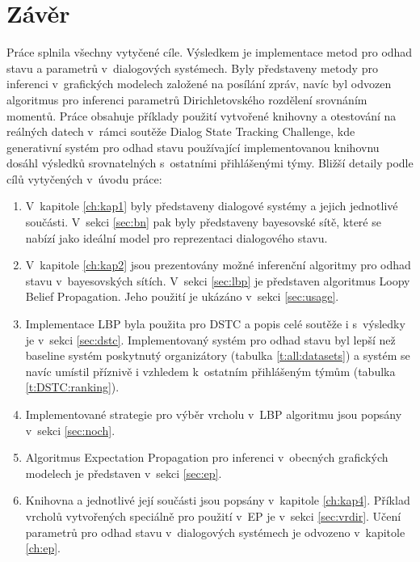 \chapter*{Závěr}

Práce splnila všechny vytyčené cíle.
Výsledkem je implementace metod pro odhad stavu a parametrů v~dialogových systémech.
Byly představeny metody pro inferenci v~grafických modelech založené na posílání zpráv, navíc byl odvozen algoritmus pro inferenci parametrů Dirichletovského rozdělení srovnáním momentů.
Práce obsahuje příklady použití vytvořené knihovny a otestování na reálných datech v~rámci soutěže Dialog State Tracking Challenge, kde generativní systém pro odhad stavu používající implementovanou knihovnu dosáhl výsledků srovnatelných s~ostatními přihlášenými týmy.
Bližší detaily podle cílů vytyčených v~úvodu práce:
\begin{enumerate}

\item V~kapitole \ref{ch:kap1} byly představeny dialogové systémy a jejich jednotlivé součásti.
V~sekci \ref{sec:bn} pak byly představeny bayesovské sítě, které se nabízí jako ideální model pro reprezentaci dialogového stavu.

\item V~kapitole \ref{ch:kap2} jsou prezentovány možné inferenční algoritmy pro odhad stavu v~bayesovských sítích.
V~sekci \ref{sec:lbp} je představen algoritmus Loopy Belief Propagation.
Jeho použití je ukázáno v~sekci \ref{sec:usage}.

\item Implementace LBP byla použita pro DSTC a popis celé soutěže i s~výsledky je v~sekci \ref{sec:dstc}.
Implementovaný systém pro odhad stavu byl lepší než baseline systém poskytnutý organizátory (tabulka \ref{t:all:datasets}) a systém se navíc umístil příznivě i vzhledem k~ostatním přihlášeným týmům (tabulka \ref{t:DSTC:ranking}).

\item Implementované strategie pro výběr vrcholu v~LBP algoritmu jsou popsány v~sekci \ref{sec:noch}.

\item Algoritmus Expectation Propagation pro inferenci v~obecných grafických modelech je představen v~sekci \ref{sec:ep}.

\item Knihovna a jednotlivé její součásti jsou popsány v~kapitole \ref{ch:kap4}.
Příklad vrcholů vytvořených speciálně pro použití v~EP je v~sekci \ref{sec:vrdir}.
Učení parametrů pro odhad stavu v~dialogových systémech je odvozeno v~kapitole \ref{ch:ep}.
\end{enumerate}

